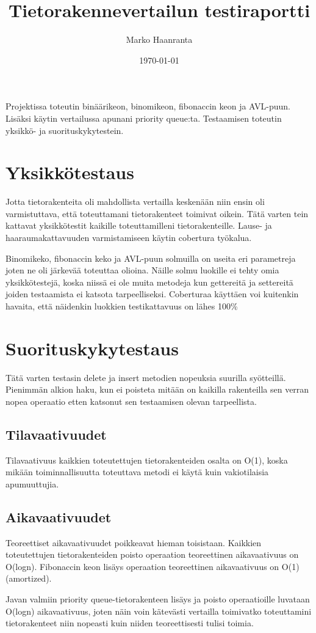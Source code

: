 \documentclass[11pt,a4paper]{article}
\author{Marko Haanranta}
\date{\today}
\title{Tietorakennevertailun testiraportti}
\begin{document}
\maketitle
Projektissa toteutin binäärikeon, binomikeon, fibonaccin keon ja AVL-puun. Lisäksi käytin vertailussa apunani priority queue:ta. 
Testaamisen toteutin yksikkö- ja suorituskykytestein.
\section{Yksikkötestaus}
Jotta tietorakenteita oli mahdollista vertailla keskenään niin ensin oli varmistuttava, että toteuttamani tietorakenteet toimivat oikein. Tätä varten tein kattavat yksikkötestit kaikille toteuttamilleni tietorakenteille. Lause- ja haaraumakattavuuden varmistamiseen käytin cobertura työkalua.

Binomikeko, fibonaccin keko ja AVL-puun solmuilla on useita eri parametreja joten ne oli järkevää toteuttaa olioina. Näille solmu luokille ei tehty omia yksikkötestejä, koska niissä ei ole muita metodeja kun gettereitä ja settereitä joiden testaamista ei katsota tarpeelliseksi. Coberturaa käyttäen voi kuitenkin havaita, että näidenkin luokkien testikattavuus on lähes 100\%
\section{Suorituskykytestaus}
Tätä varten testasin delete ja insert metodien nopeuksia suurilla syötteillä. Pienimmän alkion haku, kun ei poisteta mitään on kaikilla rakenteilla sen verran nopea operaatio etten katsonut sen testaamisen olevan tarpeellista.
\subsection{Tilavaativuudet}
Tilavaativuus kaikkien toteutettujen tietorakenteiden osalta on O(1), koska mikään toiminnallisuutta toteuttava metodi ei käytä kuin vakiotilaisia apumuuttujia.
\subsection{Aikavaativuudet}
Teoreettiset aikavaativuudet poikkeavat hieman toisistaan. Kaikkien toteutettujen tietorakenteiden poisto operaation teoreettinen aikavaativuus on O(logn). Fibonaccin keon lisäys operaation teoreettinen aikavaativuus on O(1)(amortized). 

Javan valmiin priority queue-tietorakenteen lisäys ja poisto operaatioille luvataan O(logn) aikavaativuus, joten näin voin kätevästi vertailla toimivatko toteuttamini tietorakenteet niin nopeasti kuin niiden teoreettisesti tulisi toimia.
\end{document}
